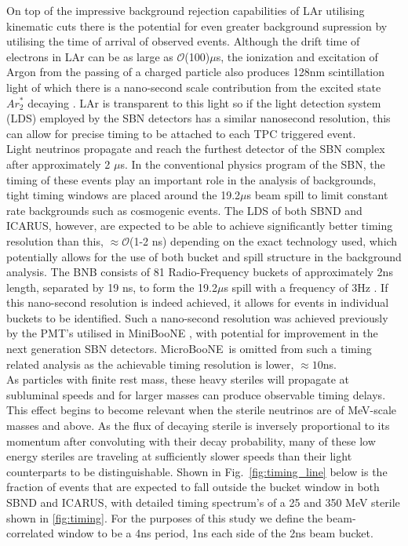 \documentclass[11pt, a4paper]{article}
\newcommand{\reffig}[1]{Fig.~\ref{#1}}
\def\muboone{MicroBooNE}
\begin{document}
On top of the impressive background rejection capabilities of LAr utilising kinematic cuts there is the potential for even greater background supression by utilising the time of arrival of observed events. Although the drift time of electrons in LAr can be as large as $\mathcal{O}$(100)$\mu$s, the ionization and excitation of Argon from the passing of a charged particle also produces 128nm scintillation light of which there is a nano-second scale contribution from the excited state $Ar^*_2$ decaying \cite{Acciarri:2015hha}. LAr is transparent to this light so if the light detection system (LDS) employed by the SBN detectors has a similar nanosecond resolution, this can allow for precise timing to be attached to each TPC triggered event.\\

Light neutrinos propagate and reach the furthest detector
of the SBN complex after approximately 2 $\mu$s. In the conventional physics program
of the SBN, the timing of these events play an important role in the analysis
of backgrounds, tight timing windows are placed around the 19.2$\mu$s beam
spill to limit constant rate backgrounds such as cosmogenic events. The LDS of both SBND
and ICARUS, however, are expected to be able to achieve significantly better
timing resolution than this, $\approx \mathcal{O}$(1-2 ns) depending on the exact technology used, which potentially allows for the use of both bucket
and spill structure in the background analysis. The BNB consists of 81
Radio-Frequency buckets of approximately 2ns length, separated by 19 ns, to
form the 19.2$\mu$s spill with a frequency of 3Hz \cite{Antonello:2015lea}.
If this nano-second resolution is indeed achieved, it allows for events in individual buckets to be
identified. Such a nano-second resolution was achieved previously by the PMT's utilised in MiniBooNE \cite{Antonello:2015lea}, with potential for improvement in the next generation SBN detectors. \muboone\ is omitted from such a timing related analysis as the achievable timing
resolution is lower, $\approx 10$ns. \\

As particles with finite rest mass, these heavy steriles will propagate
at subluminal speeds and for larger masses can produce observable timing
delays. This effect begins to become relevant when the sterile neutrinos are of
MeV-scale masses and above. As the flux of decaying sterile is inversely
proportional to its momentum after convoluting with their decay probability, many of these low energy steriles are
traveling at sufficiently slower speeds than their light counterparts to be distinguishable. Shown
in \reffig{fig:timing_line} below is the fraction of events that are expected
to fall outside the  bucket window in both SBND and ICARUS, with detailed
timing spectrum's of a 25 and 350 MeV sterile shown in \ref{fig:timing}. For the purposes of this study we define the beam-correlated window to be a 4ns period, 1ns each side of the 2ns beam bucket.
\end{document}
